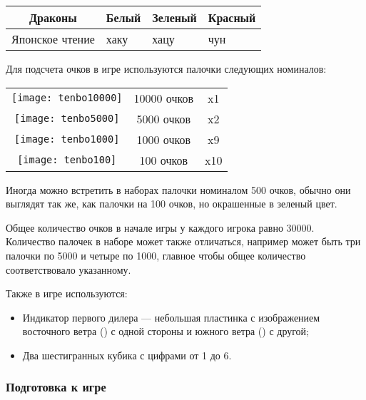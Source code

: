 \vspace{1cm}

\noindent\begin{tabular}{ cC{2cm}C{2cm}C{2cm} } 
	\toprule
	 \rule[0ex]{0pt}{7ex} Драконы &  \newline Белый &  \newline Зеленый &  \newline Красный \\
	\midrule
	Японское чтение & хаку & хацу & чун \\
	\bottomrule
\end{tabular}

\pagebreak

Для подсчета очков в игре используются палочки следующих номиналов:

\noindent\begin{tabular}{ ccc } 
	\toprule
	\texttt{[image: tenbo10000]} & 10000 очков & x1 \\
	\texttt{[image: tenbo5000]} & 5000 очков & x2 \\
	\texttt{[image: tenbo1000]} & 1000 очков & x9 \\
	\texttt{[image: tenbo100]} & 100 очков & x10 \\
	\bottomrule
\end{tabular}

Иногда можно встретить в наборах палочки номиналом 500 очков, обычно они выглядят так же, как палочки на 100 очков, но окрашенные в зеленый цвет.

Общее количество очков в начале игры у каждого игрока равно 30000. Количество палочек в наборе может также отличаться, например может быть три палочки по 5000 и четыре по 1000, главное чтобы общее количество соответствовало указанному.

Также в игре используются:
\begin{itemize}
	\item Индикатор первого дилера --- небольшая пластинка с изображением восточного ветра () с одной стороны и южного ветра () с другой;
	\item Два шестигранных кубика с цифрами от 1 до 6.
\end{itemize}

\subsubsection{Подготовка к игре}


